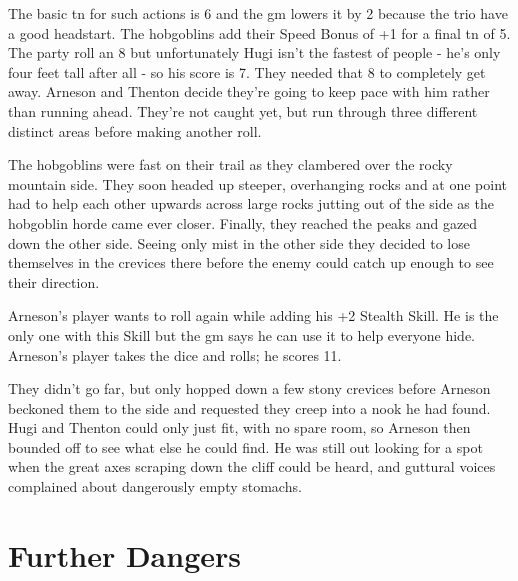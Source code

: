 \documentclass[titlepage,a4paper,openany]{book}
\begin{document}
\begin{multicols}{2}
{\begin{exampletext}
	The basic \gls{tn} for such actions is 6 and the \gls{gm} lowers it by 2 because the trio have a good headstart. The hobgoblins add their Speed Bonus of +1 for a final \gls{tn} of 5. The party roll an 8 but unfortunately Hugi isn't the fastest of people - he's only four feet tall after all - so his score is 7. They needed that 8 to completely get away. Arneson and Thenton decide they're going to keep pace with him rather than running ahead. They're not caught yet, but run through three different distinct areas before making another roll.

The hobgoblins were fast on their trail as they clambered over the rocky mountain side.
They soon headed up steeper, overhanging rocks and at one point had to help each other upwards across large rocks jutting out of the side as the hobgoblin horde came ever closer.
Finally, they reached the peaks and gazed down the other side.
Seeing only mist in the other side they decided to lose themselves in the crevices there before the enemy could catch up enough to see their direction.

	Arneson's player wants to roll again while adding his +2 Stealth Skill. He is the only one with this Skill but the \gls{gm} says he can use it to help everyone hide.  Arneson's player takes the dice and rolls; he scores 11.

	They didn't go far, but only hopped down a few stony crevices before Arneson beckoned them to the side and requested they creep into a nook he had found.
Hugi and Thenton could only just fit, with no spare room, so Arneson then bounded off to see what else he could find.
He was still out looking for a spot when the great axes scraping down the cliff could be heard, and guttural voices complained about dangerously empty stomachs.
\end{exampletext}
}{}

\end{multicols}

\section{Further Dangers}
\end{document}
